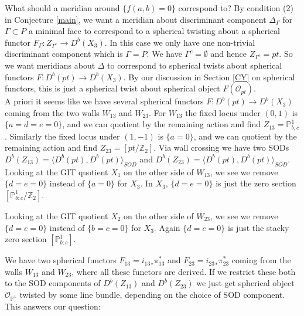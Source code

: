 \documentclass[oneside,reqno]{amsart}
\theoremstyle{definition}
\theoremstyle{definition}
\theoremstyle{definition}
\theoremstyle{definition}
\newcommand{\PP}{\mathbb{P}}
\newcommand{\Z}{\mathbb{Z}}
\newcommand{\Os}{\mathcal{O}}
\begin{document}
\newline
What should a meridian around $\{ f(a,b)=0\}$ correspond to? By condition (2) in Conjecture \ref{main}, we want a meridian about discriminant component $\Delta_{\Gamma}$ for $\Gamma \subset P$ a minimal face to correspond to a spherical twisting about a spherical functor $F_{\Gamma}: Z_{\Gamma^c} \to D^b(X_3)$. In this case we only have one non-trivial discriminant component which is $\Gamma = P$. We have $\Gamma^c = \emptyset$ and hence $Z_{\Gamma^c} = pt$. So we want meridians about $\Delta$ to correspond to spherical twists about spherical functors $F: D^b(pt) \to D^b(X_3)$. By our discussion in Section \ref{CY} on spherical functors, this is just a spherical twist about spherical object $F(\Os_{pt})$.\\
\newline 
A priori it seems like we have several spherical functors $F: D^b(pt) \to D^b(X_3)$ coming from the two walls $W_{13}$ and $W_{23}$. For $W_{13}$ the fixed locus under $(0,1)$ is $\{ a=d=e=0 \}$, and we can quotient by the remaining action and find $Z_{13} = \PP^1_{b,c}$. Similarly the fixed locus under $(1,-1)$ is $\{ a=0\}$, and we can quotient by the remaining action and find $Z_{23} = \left[ pt / \Z_2\right]$. Via wall crossing we have two SODs $D^b(Z_{13}) = \langle D^b(pt), D^b(pt) \rangle_{SOD}$ and $D^b(Z_{23}) = \langle D^b(pt), D^b(pt) \rangle_{SOD}$. Looking at the GIT quotient $X_1$ on the other side of $W_{13}$, we see we  remove $\{ d=e=0\}$ instead of $\{ a=0\}$ for $X_3$. In $X_3$, $\{ d=e=0\}$ is just the zero section $\left[\PP^1_{b:c}/ \Z_2 \right]$.
\begin{center}
\end{center}
Looking at the GIT quotient $X_2$ on the other side of $W_{23}$, we see we  remove $\{ d=e=0\}$ instead of $\{ b=c=0\}$ for $X_3$. Again $\{ d=e=0\}$ is just the stacky zero section $\left[\PP^1_{b:c} \right]$.
\begin{center}
\end{center}
We have two spherical functors $F_{13} = {i_{13}}_* \pi_{13}^*$ and $F_{23} = {i_{23}}_* \pi_{23}^*$ coming from the walls $W_{13}$ and $W_{23}$, where all these functors are derived. If we restrict these both to the SOD components of $D^b(Z_{13})$ and $D^b(Z_{23})$ we just get spherical object $\Os_{\PP^1}$ twisted by some line bundle, depending on the choice of SOD component. This answers our question:
\end{document}
